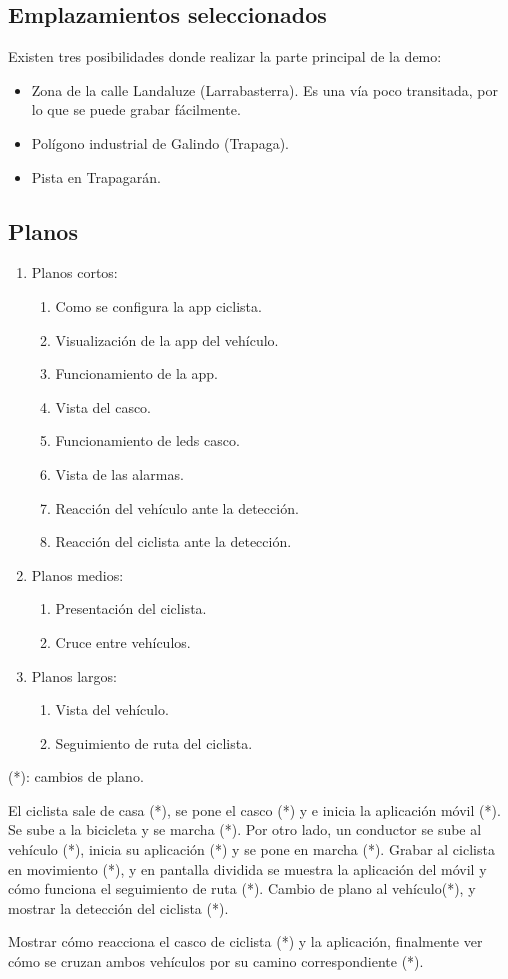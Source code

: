 \subsection{Emplazamientos seleccionados}
Existen tres posibilidades donde realizar la parte principal de la demo:
\begin{itemize}
	\item Zona de la calle Landaluze (Larrabasterra). Es una vía poco transitada,
	por lo que se puede grabar fácilmente.

	\item Polígono industrial de Galindo (Trapaga).

	\item Pista en Trapagarán.
\end{itemize}

\subsection{Planos}
\begin{enumerate}
	\item Planos cortos:
	\begin{enumerate}
		\item Como se configura la app ciclista.
		\item Visualización de la app del vehículo.
		\item Funcionamiento de la app.
		\item Vista del casco.
		\item Funcionamiento de leds casco.
		\item Vista de las alarmas.
		\item Reacción del vehículo ante la detección.
		\item Reacción del ciclista ante la detección.
	\end{enumerate}

	\item Planos medios:
	\begin{enumerate}
		\item Presentación del ciclista.
		\item Cruce entre vehículos.
	\end{enumerate}

	\item Planos largos:
	\begin{enumerate}
		\item Vista del vehículo.
		\item Seguimiento de ruta del ciclista.
	\end{enumerate}
\end{enumerate}
(*): cambios de plano.

El ciclista sale de casa (*), se pone el casco (*) y e inicia la aplicación
móvil (*). Se sube a la bicicleta y se marcha (*). Por otro lado, un conductor
se sube al vehículo (*), inicia su aplicación (*) y se pone en marcha (*).
Grabar al ciclista en movimiento (*), y en pantalla dividida se muestra la
aplicación del móvil y cómo funciona el seguimiento de ruta (*). Cambio de
plano al vehículo(*), y mostrar la detección del ciclista (*).

Mostrar cómo reacciona el casco de ciclista (*) y la aplicación, finalmente
ver cómo se cruzan ambos vehículos por su camino correspondiente (*).
